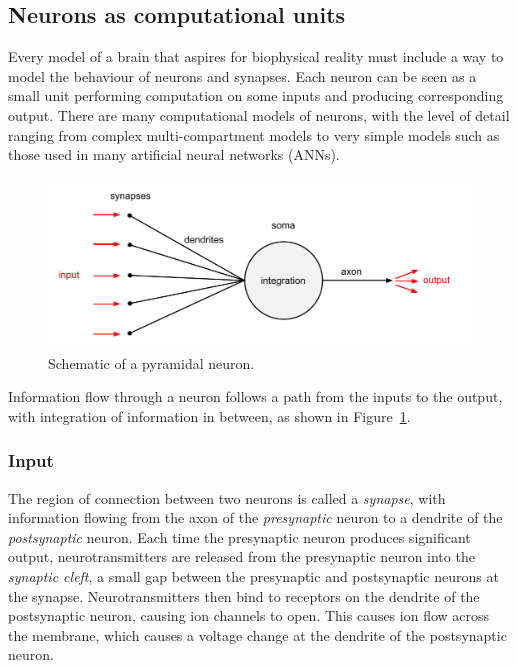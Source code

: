 \documentclass[a4paper,12pt]{report}
\theoremstyle{definition}
\begin{document}
\subsection{Neurons as computational units}
Every model of a brain that aspires for biophysical reality must include a way to model the behaviour of neurons and synapses. Each neuron can be seen as a small unit performing computation on some inputs and producing corresponding output. There are many computational models of neurons, with the level of detail ranging from complex multi-compartment models to very simple models such as those used in many artificial neural networks (ANNs). 

\begin{figure}[h]
    \includegraphics[width=\textwidth]{fig1}
    \caption{Schematic of a pyramidal neuron.}
    \label{fig:pyramidal}
\end{figure}

Information flow through a neuron follows a path from the inputs to the output, with integration of information in between, as shown in Figure~\ref{fig:pyramidal}.


\subsubsection{Input}

The region of connection between two neurons is called a \emph{synapse}, with information flowing from the axon of the \emph{presynaptic} neuron to a dendrite of the \emph{postsynaptic} neuron. Each time the presynaptic neuron produces significant output, neurotransmitters are released from the presynaptic neuron into the \emph{synaptic cleft}, a small gap between the presynaptic and postsynaptic neurons at the synapse.
Neurotransmitters then bind to receptors on the dendrite of the postsynaptic neuron, causing ion channels to open. This causes ion flow across the membrane, which causes a voltage change at the dendrite of the postsynaptic neuron.
\end{document}
